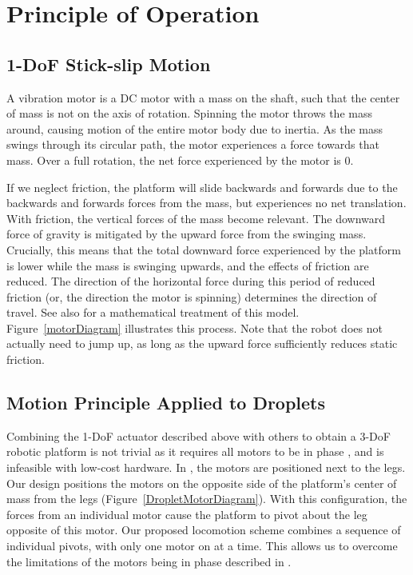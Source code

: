 \documentclass[letterpaper, 10pt, conference]{ieeeconf}
\begin{document}
\section{Principle of Operation}

\subsection{1-DoF Stick-slip Motion}
A vibration motor is a DC motor with a mass on the shaft, such that the center of mass is not on the axis of rotation. Spinning the motor throws the mass around, causing motion of the entire motor body due to inertia. As the mass swings through its circular path, the motor experiences a force towards that mass. Over a full rotation, the net force experienced by the motor is 0.

If we neglect friction, the platform will slide backwards and forwards due to the backwards and forwards forces from the mass, but experiences no net translation. With friction, the vertical forces of the mass become relevant. The downward force of gravity is mitigated by the upward force from the swinging mass. Crucially, this means that the total downward force experienced by the platform is lower while the mass is swinging upwards, and the effects of friction are reduced. The direction of the horizontal force during this period of reduced friction (or, the direction the motor is spinning) determines the direction of travel. See also \cite{Vartholomeos2005,Vartholomeos2006} for a mathematical treatment of this model. Figure~\ref{motorDiagram} illustrates this process. Note that the robot does not actually need to jump up, as long as the upward force sufficiently reduces static friction. 

\subsection{Motion Principle Applied to Droplets}
Combining the 1-DoF actuator described above with others to obtain a 3-DoF robotic platform is not trivial as it requires all motors to be in phase \cite{Vartholomeos2005}, and is infeasible with low-cost hardware. In \cite{Vartholomeos2005}, the motors are positioned next to the legs. Our design positions the motors on the opposite side of the platform's center of mass from the legs (Figure~\ref{DropletMotorDiagram}). With this configuration, the forces from an individual motor cause the platform to pivot about the leg opposite of this motor. Our proposed locomotion scheme combines a sequence of individual pivots, with only one motor on at a time. This allows us to overcome the limitations of the motors being in phase described in \cite{Vartholomeos2005}.
\end{document}
